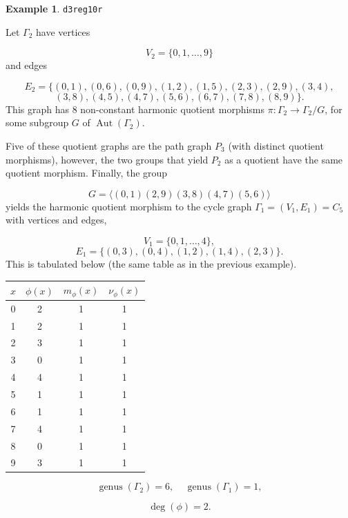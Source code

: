 \documentclass[12pt,letterpaper]{article}
\theoremstyle{definition}
\newtheorem{example}[theorem]{Example}
\DeclareMathOperator{\Aut}{Aut}
\DeclareMathOperator{\genus}{genus}
\begin{document}
\begin{example}%
\label{example:d3reg10r}
  {\tt d3reg10r}\newline
{\rm  
Let $\Gamma_2$ have vertices

\[
V_2=\{0,1,\dots,9\}
\]
and edges

\[
E_2 = \{
(0, 1), (0, 6), (0, 9), (1, 2), (1, 5), (2, 3), (2, 9), (3, 4), 
\]
\[
(3, 8), (4, 5), (4, 7), (5, 6), (6, 7), (7, 8), (8, 9)
\}.
\]
This graph has $8$ non-constant harmonic quotient
morphisms $\pi: \Gamma_2\to \Gamma_2/G$, for some subgroup
$G$ of $\Aut(\Gamma_2)$.

Five of these quotient graphs are the path graph $P_3$
(with distinct quotient morphisms), 
however, the two groups that yield $P_2$ as a quotient have the
same quotient morphism.
Finally, the
group

\[
G = \langle (0,1)(2,9)(3,8)(4,7)(5,6) \rangle
\]
yields the
harmonic quotient morphism to the cycle graph
$\Gamma_1 = (V_1,E_1) = C_5$
with vertices and edges,

\[
V_1=\{0,1,\dots, 4\},
\]
\[
E_1=\{
(0, 3), (0, 4), (1, 2), (1, 4), (2, 3)
\}.
\]
This is tabulated below (the same table as in the previous example).

\begin{center}
\begin{tabular}{c|c|c|c}  
  $x$ & $\phi(x)$ & $m_\phi(x)$ & $\nu_\phi(x)$ \\ \hline
  0   &    2   &        1         &  1   \\ 
  1   &    2   &        1         &  1   \\ 
  2   &    3   &        1         &  1   \\ 
  3   &    0   &        1         &  1   \\ 
  4   &    4   &        1         &  1   \\ 
  5   &    1   &        1         &  1    \\ 
  6   &    1   &        1         &  1   \\ 
  7   &    4   &        1         &  1   \\
  8   &    0   &        1         &  1   \\
  9   &    3   &        1         &  1   \\ 
\end{tabular}
\end{center}

\[
  \genus(\Gamma_2) =6,\ \ \ \ \
  \genus(\Gamma_1) =1,
\]

\[
\deg(\phi) =2.
\]

}
\end{example}
\end{document}
